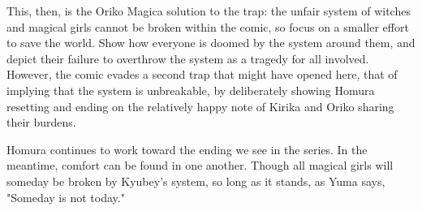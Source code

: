 This, then, is the Oriko Magica solution to the trap: the unfair system of witches and magical girls cannot be broken within the comic, so focus on a smaller effort to save the world. Show how everyone is doomed by the system around them, and depict their failure to overthrow the system as a tragedy for all involved. However, the comic evades a second trap that might have opened here, that of implying that the system is unbreakable, by deliberately showing Homura resetting and ending on the relatively happy note of Kirika and Oriko sharing their burdens.

Homura continues to work toward the ending we see in the series. In the meantime, comfort can be found in one another. Though all magical girls will someday be broken by Kyubey's system, so long as it stands, as Yuma says, "Someday is not today."
